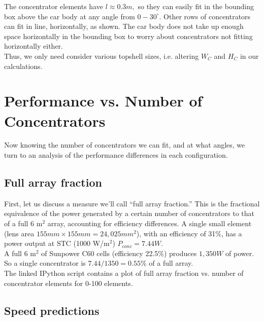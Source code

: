 \documentclass[reqno, 11pt, final]{article}
\begin{document}
The concentrator elements have $l \approx 0.3 m,$ so they can easily fit in the bounding box above the car body at any angle from $0-30^{\circ}$. Other rows of concentrators can fit in line, horizontally, as shown. The car body does not take up enough space horizontally in the bounding box to worry about concentrators not fitting horizontally either. \\

Thus, we only need consider various topshell sizes, i.e. altering $W_C$ and $H_C$ in our calculations.

\newpage
\section{Performance vs. Number of Concentrators}

Now knowing the number of concentrators we can fit, and at what angles, we turn to an analysis of the performance differences in each configuration. \\

\subsection{Full array fraction}

First, let us discuss a measure we'll call ``full array fraction.'' This is the fractional equivalence of the power generated by a certain number of concentrators to that of a full 6 m$^2$ array, accounting for efficiency differences. A single small element (lens area $155mm \times 155mm = 24,025 mm^2$), with an efficiency of 31\%, has a power output at STC (1000 W/m$^2$) $P_{conc} = 7.44 W$. \\

A full 6 m$^2$ of Sunpower C60 cells (efficiency 22.5\%) produces $1,350 W$ of power. So a single concentrator is $7.44 / 1350 = 0.55$\% of a full array. \\

The linked IPython script contains a plot of full array fraction vs. number of concentrator elements for 0-100 elements. \\

\subsection{Speed predictions}
\end{document}
